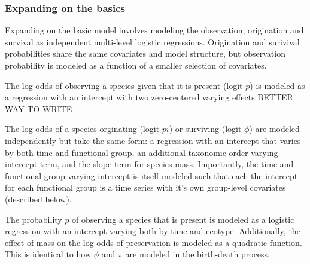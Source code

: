 \documentclass[12pt,letterpaper]{article}
\begin{document}
\subsubsection*{Expanding on the basics}
Expanding on the basic model involves modeling the observation, origination and survival as independent multi-level logistic regressions. Origination and surivival probabilities share the same covariates and model structure, but observation probability is modeled as a function of a smaller selection of covariates.

The log-odds of observing a species given that it is present (logit \(p\)) is modeled as a regression with an intercept with two zero-centered varying effects BETTER WAY TO WRITE

The log-odds of a species orginating (logit \(pi\)) or surviving (logit \(\phi\)) are modeled independently but take the same form: a regression with an intercept that varies by both time and functional group, an additional taxonomic order varying-intercept term, and the slope term for species mass. Importantly, the time and functional group varying-intercept is itself modeled such that each the intercept for each functional group is a time series with it's own group-level covariates (described below). 



The probability \(p\) of observing a species that is present is modeled as a logistic regression with an intercept varying both by time and ecotype. Additionally, the effect of mass on the log-odds of preservation is modeled as a quadratic function. This is identical to how \(\phi\) and \(\pi\) are modeled in the birth-death process.
\end{document}
